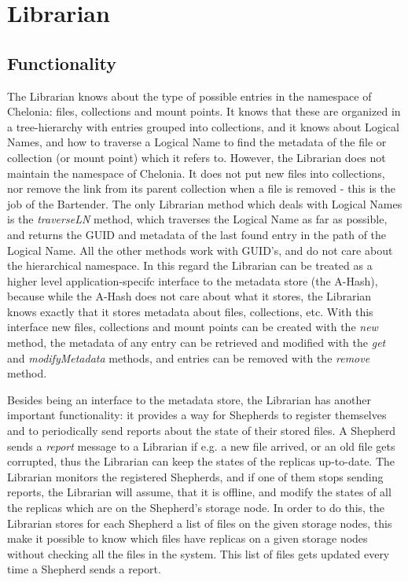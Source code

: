 \documentclass{book}
\begin{document}

\newpage

\section{Librarian} %
\label{sec:librarian}

\subsection{Functionality} %
% 

The Librarian knows about the type of possible entries in the namespace of Chelonia: files, collections and mount points. It knows that these are organized in a tree-hierarchy with entries grouped into collections, and it knows about Logical Names, and how to traverse a Logical Name to find the metadata of the file or collection (or mount point) which it refers to. However, the Librarian does not maintain the namespace of Chelonia. It does not put new files into collections, nor remove the link from its parent collection when a file is removed - this is the job of the Bartender. The only Librarian method which deals with Logical Names is the \emph{traverseLN} method, which traverses the Logical Name as far as possible, and returns the GUID and metadata of the last found entry in the path of the Logical Name. All the other methods work with GUID's, and do not care about the hierarchical namespace. In this regard the Librarian can be treated as a higher level application-specifc interface to the metadata store (the A-Hash), because while the A-Hash does not care about what it stores, the Librarian knows exactly that it stores metadata about files, collections, etc. With this interface new files, collections and mount points can be created with the \emph{new} method, the metadata of any entry can be retrieved and modified with the \emph{get} and \emph{modifyMetadata} methods, and entries can be removed with the \emph{remove} method.

Besides being an interface to the metadata store, the Librarian has another important functionality: it provides a way for Shepherds to register themselves and to periodically send reports about the state of their stored files. A Shepherd sends a \emph{report} message to a Librarian if e.g. a new file arrived, or an old file gets corrupted, thus the Librarian can keep the states of the replicas up-to-date. The Librarian monitors the registered Shepherds, and if one of them stops sending reports, the Librarian will assume, that it is offline, and modify the states of all the replicas which are on the Shepherd's storage node. In order to do this, the Librarian stores for each Shepherd a list of files on the given storage nodes, this make it possible to know which files have replicas on a given storage nodes without checking all the files in the system. This list of files gets updated every time a Shepherd sends a report.
\end{document}
